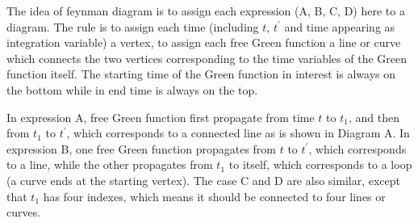 The idea of feynman diagram is to assign each expression (A, B, C, D) here to a diagram.
The rule is to assign each time (including $t$, $t^{\prime}$ and time appearing as integration variable) a vertex, to assign each free Green function a line or curve which connects the two vertices corresponding to the time variables of the Green function itself.
The starting time of the Green function in interest is always on the bottom while in end time is always on the top.

In expression A, free Green function first propagate from time $t$ to $t_1$, and then from $t_1$ to $t^{\prime}$, which corresponds to a connected line as is shown in Diagram A.
In expression B, one free Green function propagates from $t$ to $t^{\prime}$, which corresponds to a line, while the other propagates from $t_1$ to itself, which corresponds to a loop (a curve ends at the starting vertex).
The case C and D are also similar, except that $t_1$ has four indexes, which means it should be connected to four lines or curves.

